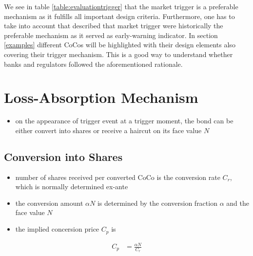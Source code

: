 We see in table \ref{table:evaluationtrigger} that the market trigger is a preferable mechanism as it fulfills all important design criteria. Furthermore, one has to take into account that \citet{haldane2011capital} described that market trigger were historically the preferable mechanism as it served as early-warning indicator. In section \ref{examples} different CoCos will be highlighted with their design elements also covering their trigger mechanism. This is a good way to understand whether banks and regulators followed the aforementioned rationale.

\section{Loss-Absorption Mechanism}

\begin{itemize}
\item on the appearance of trigger event at a trigger moment, the bond can be either convert into shares or receive a haircut on its face value $N$
\end{itemize}

\subsection{Conversion into Shares}
\begin{itemize}
\item number of shares received per converted CoCo is the conversion rate $C_r$, which is normally determined ex-ante
\item the conversion amount $\alpha N$ is determined by the conversion fraction $\alpha$ and the face value $N$
\item the implied concersion price $C_p$ is
\end{itemize}

\begin{align}
C_p &= \frac{\alpha N}{C_r}
\end{align}

